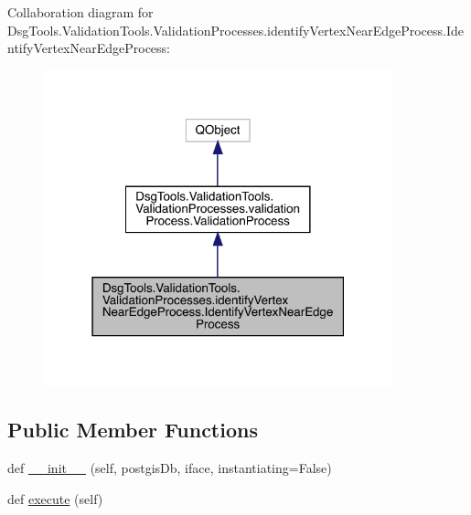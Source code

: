 Collaboration diagram for Dsg\+Tools.\+Validation\+Tools.\+Validation\+Processes.\+identify\+Vertex\+Near\+Edge\+Process.\+Identify\+Vertex\+Near\+Edge\+Process\+:
\nopagebreak
\begin{figure}[H]
\begin{center}
\leavevmode
\includegraphics[width=286pt]{class_dsg_tools_1_1_validation_tools_1_1_validation_processes_1_1identify_vertex_near_edge_proce606cfa81977cb6da07163768b2839898}
\end{center}
\end{figure}
\subsection*{Public Member Functions}
\begin{DoxyCompactItemize}
\item 
def \mbox{\hyperlink{class_dsg_tools_1_1_validation_tools_1_1_validation_processes_1_1identify_vertex_near_edge_proce6037dafbf6b8f68cfd2bcf606f8923c2_abc6add448f3610c75acaedbe0a3fd6f7}{\+\_\+\+\_\+init\+\_\+\+\_\+}} (self, postgis\+Db, iface, instantiating=False)
\item 
def \mbox{\hyperlink{class_dsg_tools_1_1_validation_tools_1_1_validation_processes_1_1identify_vertex_near_edge_proce6037dafbf6b8f68cfd2bcf606f8923c2_af8bc4ee2be54dac195cb5444dac79696}{execute}} (self)
\end{DoxyCompactItemize}
